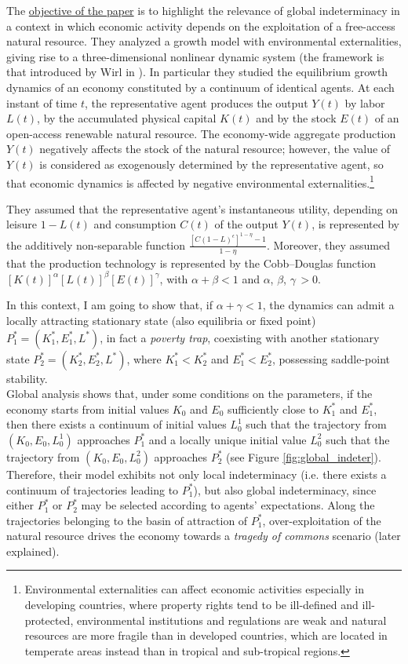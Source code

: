The \underline{objective of the paper} \cite{antoci_poverty_2011} is to highlight the relevance of global indeterminacy in a context in which economic activity depends on the exploitation of a free-access natural resource. They analyzed a growth model with environmental externalities, giving rise to a three-dimensional nonlinear dynamic system (the framework is that introduced by Wirl in \cite{wirl_stability_1997}). In particular they studied the equilibrium growth dynamics of an economy constituted by a continuum of identical agents. At each instant of time $t$, the representative agent produces the output $Y(t)$ by labor $L(t)$, by the accumulated physical capital $K(t)$ and by the stock $E(t)$ of an open-access renewable natural resource. The economy-wide aggregate production $Y(t)$ negatively affects the stock of the natural resource; however, the value of $Y(t)$ is considered as exogenously determined by the representative agent, so that economic dynamics is affected by negative environmental externalities.\footnote{Environmental externalities can affect economic activities especially in developing countries, where property rights tend to be ill-defined and ill-protected, environmental institutions and regulations are weak and natural resources are more fragile than in developed countries, which are located in temperate areas instead than in tropical and sub-tropical regions.}

They assumed that the representative agent’s instantaneous utility, depending on leisure $1-L(t)$ and consumption $C(t)$ of the output $Y(t)$, is represented by the additively non-separable function $\frac{[C(1-L)^{\epsilon}]^{1-\eta} -1}{1-\eta}$. Moreover, they assumed that the production technology is represented by the Cobb–Douglas function $[K(t)]^\alpha [L(t)]^\beta [E(t)]^\gamma$, with $\alpha + \beta < 1$ and $\alpha$, $\beta$, $\gamma \,>0$. 

In this context, I am going to show that, if $\alpha + \gamma < 1$, the dynamics can admit a locally attracting stationary state (also equilibria or fixed point) $P_1^* = (K_1^*, E_1^*, L^*)$, in fact a \textit{poverty trap}, coexisting with another stationary state $P_2^* = (K_2^*,E_2^*,L^*)$, where $K_1^* < K_2^*$ and $E_1^* < E_2^*$, possessing saddle-point stability.\\ 
Global analysis shows that, under some conditions on the parameters, if the economy starts
from initial values $K_0$ and $E_0$ sufficiently close to $K_1^*$ and $E_1^*$, then there exists a continuum of initial values $L_0^1$ such that the trajectory from $(K_0,E_0,L_0^1)$ approaches $P_1^*$ and a locally unique initial value $L_0^2$ such that the trajectory from $(K_0,E_0,L_0^2)$ approaches $P_2^*$ (see Figure \ref{fig:global_indeter}). Therefore, their model exhibits not only local indeterminacy (i.e. there exists a continuum of trajectories leading to $P_1^*$), but also global indeterminacy, since either $P_1^*$ or $P_2^*$ may be selected according to agents’ expectations. Along the trajectories belonging to the basin of attraction of $P_1^*$, over-exploitation
of the natural resource drives the economy towards a \textit{tragedy of commons} scenario (later explained).

